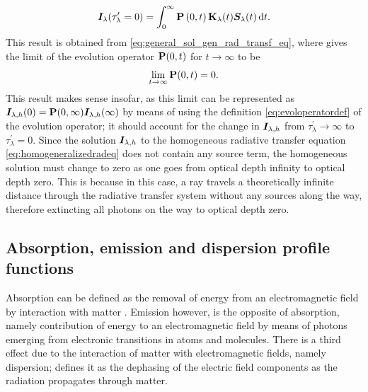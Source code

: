 \documentclass[a4paper,11pt]{report}
\begin{document}
\begin{align}
\begin{aligned}
\bm{I}_\lambda(\tau_\lambda^\prime = 0) = \int_{0}^{ \infty}\boldsymbol{\mathbf{P}}\left(0,t\right)\boldsymbol{\mathbf{K}}_\lambda(t)\bm{S}_\lambda(t)\,\mathrm{d}t.
\end{aligned}\end{align} This result is obtained from \cref{eq:general_sol_gen_rad_transf_eq}, where \cite[p.153]{delToroIniesta.2003} gives the limit of the evolution operator $\boldsymbol{\mathbf{P}}(0,t)$ for $t\rightarrow \infty$ to be \begin{equation}
\lim_{t\rightarrow \infty} \boldsymbol{\mathbf{P}}(0,t) = 0.
\end{equation} This result makes sense insofar, as this limit can be represented as $\bm{I}_{\lambda,h}(0) = \boldsymbol{\mathbf{P}}(0,\infty)\bm{I}_{\lambda,h}(\infty)$ by means of using the definition \cref{eq:evoloperatordef} of the evolution operator; it should account for the change in $\bm{I}_{\lambda,h}$ from $\tau_\lambda^\prime \rightarrow \infty$ to $\tau_\lambda^\prime = 0$. Since the solution $\bm{I}_{\lambda,h}$ to the homogeneous radiative transfer equation \cref{eq:homogeneralizedradeq} does not contain any source term, the homogeneous solution must change to zero as one goes from optical depth infinity to optical depth zero. This is because in this case, a ray travels a theoretically infinite distance through the radiative transfer system without any sources along the way, therefore extincting all photons on the way to optical depth zero.

\subsection{Absorption, emission and dispersion profile functions}
Absorption can be defined as the removal of energy from an electromagnetic field by interaction with matter \cite[p.87]{delToroIniesta.2003}. Emission however, is the opposite of absorption, namely contribution of energy to an electromagnetic field by means of photons emerging from electronic transitions in atoms and molecules. There is a third effect due to the interaction of matter with electromagnetic fields, namely dispersion; \cite[p.87]{delToroIniesta.2003} defines it as the dephasing of the electric field components as the radiation propagates through matter.
\end{document}
